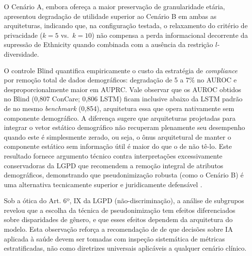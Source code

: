 O Cenário A, embora ofereça a maior preservação de granularidade etária, apresentou degradação de utilidade superior ao Cenário B em ambas as arquiteturas, indicando que, na configuração testada, o relaxamento do critério de privacidade ($k=5$ vs.\ $k=10$) não compensa a perda informacional decorrente da supressão de Ethnicity quando combinada com a ausência da restrição $l$-diversidade.

O controle Blind quantifica empiricamente o custo da estratégia de \textit{compliance} por remoção total de dados demográficos: degradação de 5 a 7\% no AUROC e desproporcionalmente maior em AUPRC. Vale observar que os AUROC obtidos no Blind (0,807 ConCare; 0,806 LSTM) ficam inclusive abaixo da LSTM padrão de  no mesmo \textit{benchmark} (0,854), arquitetura essa que opera nativamente sem componente demográfico. A diferença sugere que arquiteturas projetadas para integrar o vetor estático demográfico não recuperam plenamente seu desempenho quando este é simplesmente zerado, ou seja, o ônus arquitetural de manter o componente estático sem informação útil é maior do que o de não tê-lo. Este resultado fornece argumento técnico contra interpretações excessivamente conservadoras da LGPD que recomendem a remoção integral de atributos demográficos, demonstrando que pseudonimização robusta (como o Cenário B) é uma alternativa tecnicamente superior e juridicamente defensável \cite{ANPD2023juridica}.

Sob a ótica do Art. 6º, IX da LGPD (não-discriminação), a análise de subgrupos revelou que a escolha da técnica de pseudonimização tem efeitos diferenciados sobre disparidades de gênero, e que esses efeitos dependem da arquitetura do modelo. Esta observação reforça a recomendação de  de que decisões sobre IA aplicada à saúde devem ser tomadas com inspeção sistemática de métricas estratificadas, não como diretrizes universais aplicáveis a qualquer cenário clínico.

